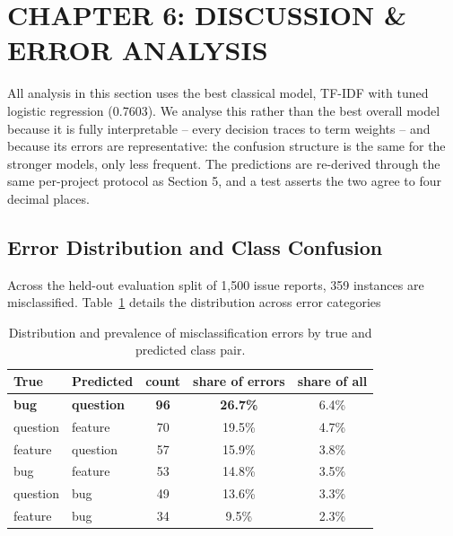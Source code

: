
\section*{CHAPTER 6: DISCUSSION \& ERROR ANALYSIS}
\setcounter{section}{6}
\setcounter{subsection}{0}
\setcounter{figure}{0}
\setcounter{table}{0}

All analysis in this section uses the best classical model, TF-IDF with tuned logistic regression (0.7603). We analyse this rather than the best overall model because it is fully interpretable -- every decision traces to term weights -- and because its errors are representative: the confusion structure is the same for the stronger models, only less frequent. The predictions are re-derived through the same per-project protocol as Section 5, and a test asserts the two agree to four decimal places.

\subsection{Error Distribution and Class Confusion}

Across the held-out evaluation split of 1,500 issue reports, 359 instances are misclassified. Table~\ref{tab:error_breakdown} details the distribution across error categories

\begin{table}[H]
\centering
\caption{Distribution and prevalence of misclassification errors by true and predicted class pair.}
\label{tab:error_breakdown}
\vspace{0.5em}
\begin{tabular}{l l c c c}
\hline
True & Predicted & count & share of errors & share of all \\
\hline
\textbf{bug} & \textbf{question} & \textbf{96} & \textbf{26.7\%} & 6.4\% \\
question & feature & 70 & 19.5\% & 4.7\% \\
feature & question & 57 & 15.9\% & 3.8\% \\
bug & feature & 53 & 14.8\% & 3.5\% \\
question & bug & 49 & 13.6\% & 3.3\% \\
feature & bug & 34 & 9.5\% & 2.3\% \\
\hline
\end{tabular}
\end{table}

